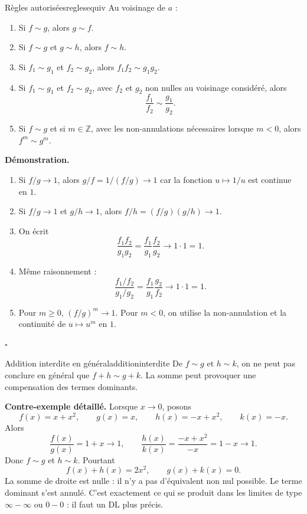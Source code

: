 \documentclass[11pt,a4paper]{article}
\begin{document}
\begin{propositionbox}{Règles autorisées}{reglesequiv}
Au voisinage de $a$ :
\begin{enumerate}[label=\textup{(\roman*)}]
\item Si $f\sim g$, alors $g\sim f$.
\item Si $f\sim g$ et $g\sim h$, alors $f\sim h$.
\item Si $f_1\sim g_1$ et $f_2\sim g_2$, alors $f_1f_2\sim g_1g_2$.
\item Si $f_1\sim g_1$ et $f_2\sim g_2$, avec $f_2$ et $g_2$ non nulles au voisinage considéré, alors
\[
  \frac{f_1}{f_2}\sim \frac{g_1}{g_2}.
\]
\item Si $f\sim g$ et si $m\in\mathbb Z$, avec les non-annulations nécessaires lorsque $m<0$, alors $f^m\sim g^m$.
\end{enumerate}
\end{propositionbox}

\textbf{Démonstration.}
\begin{enumerate}[label=\textup{(\roman*)}]
\item Si $f/g\to1$, alors $g/f=1/(f/g)\to1$ car la fonction $u\mapsto1/u$ est continue en $1$.
\item Si $f/g\to1$ et $g/h\to1$, alors $f/h=(f/g)(g/h)\to1$.
\item On écrit
\[
  \frac{f_1f_2}{g_1g_2}=\frac{f_1}{g_1}\frac{f_2}{g_2}\to1\cdot1=1.
\]
\item Même raisonnement :
\[
  \frac{f_1/f_2}{g_1/g_2}=\frac{f_1}{g_1}\frac{g_2}{f_2}\to1\cdot1=1.
\]
\item Pour $m\ge0$, $(f/g)^m\to1$. Pour $m<0$, on utilise la non-annulation et la continuité de $u\mapsto u^m$ en $1$.
\end{enumerate}
\hfill $\square$

\begin{warningbox}{Addition interdite en général}{additioninterdite}
De $f\sim g$ et $h\sim k$, on ne peut pas conclure en général que $f+h\sim g+k$. La somme peut provoquer une compensation des termes dominants.
\end{warningbox}

\textbf{Contre-exemple détaillé.} Lorsque $x\to0$, posons
\[
  f(x)=x+x^2,
  \qquad g(x)=x,
  \qquad h(x)=-x+x^2,
  \qquad k(x)=-x.
\]
Alors
\[
  \frac{f(x)}{g(x)}=1+x\to1,
  \qquad
  \frac{h(x)}{k(x)}=\frac{-x+x^2}{-x}=1-x\to1.
\]
Donc $f\sim g$ et $h\sim k$. Pourtant
\[
  f(x)+h(x)=2x^2,
  \qquad g(x)+k(x)=0.
\]
La somme de droite est nulle : il n'y a pas d'équivalent non nul possible. Le terme dominant s'est annulé. C'est exactement ce qui se produit dans les limites de type $\infty-\infty$ ou $0-0$ : il faut un DL plus précis.
\end{document}
